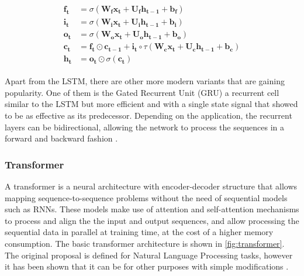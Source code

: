 \begin{align}
\label{eq:LSTM}
\begin{split}
	\mathbf{f_t} &= \sigma(\mathbf{W_f} \mathbf{x_t} + \mathbf{U_f} \mathbf{h_{t-1}} + \mathbf{b_f})\\
	\mathbf{i_t} &= \sigma(\mathbf{W_i} \mathbf{x_t} + \mathbf{U_i} \mathbf{h_{t-1}} + \mathbf{b_i})\\
	\mathbf{o_t} &= \sigma(\mathbf{W_o} \mathbf{x_t} + \mathbf{U_o} \mathbf{h_{t-1}} + \mathbf{b_o})\\
	\mathbf{c_t} &= \mathbf{f_t} \odot \mathbf{c_{t-1}} + \mathbf{i_t} \circ \tau (\mathbf{W_c} \mathbf{x_t} + \mathbf{U_c} \mathbf{h_{t-1}} + \mathbf{b_c})\\
	\mathbf{h_t} &= \mathbf{o_t} \odot \sigma(\mathbf{c_t})
\end{split}
\end{align}

Apart from the LSTM, there are other more modern variants that are gaining popularity. One of them is the Gated Recurrent Unit (GRU) \autocite{chung2014} a recurrent cell similar to the LSTM but more efficient and with a single state signal that showed to be as effective as its predecessor. Depending on the application, the recurrent layers can be bidirectional, allowing the network to process the sequences in a forward and backward fashion \autocite{schuster1997}.

\subsubsection{Transformer} \label{sec:transformer}
A transformer \autocite{vaswani2017} is a neural architecture with encoder-decoder structure that allows mapping sequence-to-sequence \autocite{sutskever2014} problems without the need of sequential models such as RNNs. These models make use of attention and self-attention mechanisms \autocite{bahdanau2015} to process and align the the input and output sequences, and allow processing the sequential data in parallel at training time, at the cost of a higher memory consumption. The basic transformer  architecture is shown in \ref{fig:transformer}. The original proposal is defined for Natural Language Processing tasks, however it has been shown that it can be for other purposes with simple modifications \autocite{naihan2019, jiarui2021, sanyuan2021}.

